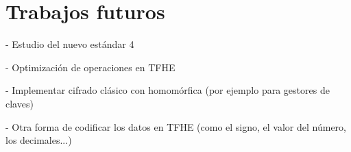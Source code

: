 \chapter{Trabajos futuros}
\label{chap:trabajos_futuros}

- Estudio del nuevo estándar 4

- Optimización de operaciones en TFHE

- Implementar cifrado clásico con homomórfica (por ejemplo para gestores de claves)

- Otra forma de codificar los datos en TFHE (como el signo, el valor del número, los decimales...)